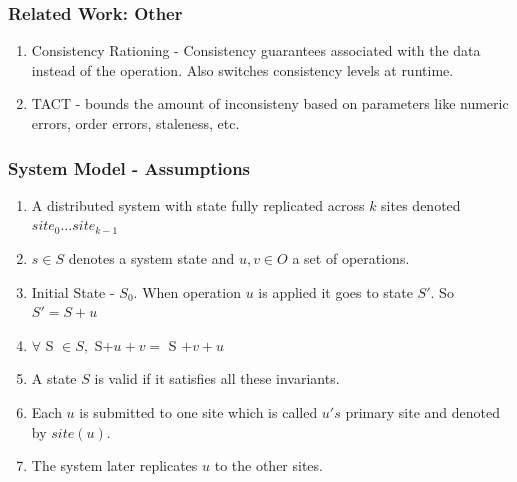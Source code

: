 \documentclass{beamer}
\begin{document}

\begin{frame}
\frametitle{Related Work: Other}
\begin{enumerate}
\item Consistency Rationing - Consistency guarantees associated with the data instead of the operation. Also switches consistency levels at runtime.
\item TACT - bounds the amount of inconsisteny based on parameters like numeric errors, order errors, staleness, etc.
\end{enumerate}

\end{frame}



\begin{frame}
\frametitle{System Model - Assumptions}
\begin{enumerate}
\item A distributed system with state fully replicated across $k$ sites denoted $site_0 \ldots site_{k-1}$
\item $s \in S$ denotes a system state and $u,v \in O$ a set of operations. 
\item Initial State - $S_0$. When operation $u$ is applied it goes to state $S'$. So $S' = S + u$
\item $ \forall$ S $\in S,$ S$+u+v = $ S $+v+u$
\item A state $S$ is valid if it satisfies all these invariants.
\item Each $u$ is submitted to one site which is called $u's$ primary site and denoted by $site(u)$.
\item The system later replicates $u$ to the other sites.
\end{enumerate}

\end{frame}

\end{document}
